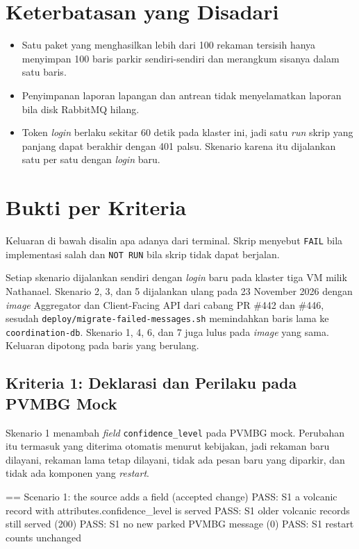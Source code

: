 \section{Keterbatasan yang Disadari}

\begin{itemize}
\item Satu paket yang menghasilkan lebih dari 100 rekaman tersisih hanya menyimpan 100 baris parkir sendiri-sendiri dan merangkum sisanya dalam satu baris.
\item Penyimpanan laporan lapangan dan antrean tidak menyelamatkan laporan bila disk RabbitMQ hilang.
\item Token \textit{login} berlaku sekitar 60 detik pada klaster ini, jadi satu \textit{run} skrip yang panjang dapat berakhir dengan 401 palsu. Skenario karena itu dijalankan satu per satu dengan \textit{login} baru.
\end{itemize}

\section{Bukti per Kriteria}

Keluaran di bawah disalin apa adanya dari terminal. Skrip menyebut \texttt{FAIL} bila implementasi salah dan \texttt{NOT RUN} bila skrip tidak dapat berjalan.

Setiap skenario dijalankan sendiri dengan \textit{login} baru pada klaster tiga VM milik Nathanael. Skenario 2, 3, dan 5 dijalankan ulang pada 23 November 2026 dengan \textit{image} Aggregator dan Client-Facing API dari cabang PR \#442 dan \#446, sesudah \texttt{deploy/migrate-failed-messages.sh} memindahkan baris lama ke \texttt{coordination-db}. Skenario 1, 4, 6, dan 7 juga lulus pada \textit{image} yang sama. Keluaran dipotong pada baris yang berulang.

\subsection{Kriteria 1: Deklarasi dan Perilaku pada PVMBG Mock}

Skenario 1 menambah \textit{field} \texttt{confidence\_level} pada PVMBG mock. Perubahan itu termasuk yang diterima otomatis menurut kebijakan, jadi rekaman baru dilayani, rekaman lama tetap dilayani, tidak ada pesan baru yang diparkir, dan tidak ada komponen yang \textit{restart}.

\begin{codebox}
== Scenario 1: the source adds a field (accepted change)
PASS: S1 a volcanic record with attributes.confidence_level is served
PASS: S1 older volcanic records still served (200)
PASS: S1 no new parked PVMBG message (0)
PASS: S1 restart counts unchanged
\end{codebox}

